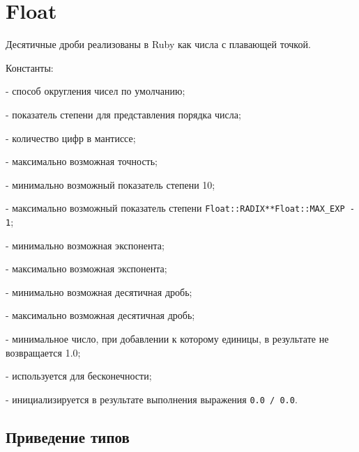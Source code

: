 \section{Float}

Десятичные дроби реализованы в Ruby как числа с плавающей точкой.
\begin{keylist}{Константы:}
  
   - способ округления чисел по умолчанию;
  
   - показатель степени для представления порядка числа;
  
   - количество цифр в мантиссе;
  
   - максимально возможная точность;
  
   - минимально возможный показатель степени 10;
  
   - максимально возможный показатель степени \verb!Float::RADIX**Float::MAX_EXP - 1!; 
  
   - минимально возможная экспонента;
  
   - максимально возможная экспонента;
  
   - минимально возможная десятичная дробь;
  
   - максимально возможная десятичная дробь;
  
   - минимальное число, при добавлении к которому единицы, в результате не возвращается 1.0;
  
   - используется для бесконечности;
  
   - инициализируется в результате выполнения выражения \verb!0.0 / 0.0!.
\end{keylist}

\subsection*{Приведение типов}

